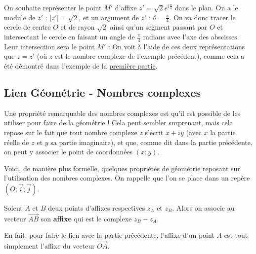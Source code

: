 	\begin{tip}[Exemple]
		On souhaite représenter le point $M'$ d'affixe $z' = \sqrt{2}e^{i\frac{\pi}{4}}$ dans le plan. On a le module de $z'$ : $|z'| = \sqrt{2}$, et un argument de $z'$ : $\theta = \frac{\pi}{4}$. On va donc tracer le cercle de centre $O$ et de rayon $\sqrt{2}$ ainsi qu'un segment passant par $O$ et intersectant le cercle en faisant un angle de $\frac{\pi}{4}$ radians avec l'axe des abscisses. Leur intersection sera le point $M'$ :
		On voit à l'aide de ces deux représentations que $z = z'$ (où $z$ est le nombre complexe de l'exemple précédent), comme cela a été démontré dans l'exemple de la \hyperref[forme-exponentielle]{première partie}.
	\end{tip}

	\subsection{Lien Géométrie - Nombres complexes}

	Une propriété remarquable des nombres complexes est qu'il est possible de les utiliser pour faire de la géométrie ! Cela peut sembler surprenant, mais cela repose sur le fait que tout nombre complexe $z$ s'écrit $x + iy$ (avec $x$ la partie réelle de $z$ et $y$ sa partie imaginaire), et que, comme dit dans la partie précédente, on peut y associer le point de coordonnées $(x; y)$.

	Voici, de manière plus formelle, quelques propriétés de géométrie reposant sur l'utilisation des nombres complexes. On rappelle que l'on se place dans un repère $(O; \overrightarrow{i}; \overrightarrow{j})$.

	\begin{formula}
		Soient $A$ et $B$ deux points d'affixes respectives $z_A$ et $z_B$. Alors on associe au vecteur $\overrightarrow{AB}$ son \textbf{affixe} qui est le complexe $z_B - z_A$.
	\end{formula}

	\begin{tip}
		En fait, pour faire le lien avec la partie précédente, l'affixe d'un point $A$ est tout simplement l'affixe du vecteur $\overrightarrow{OA}$.
	\end{tip}


